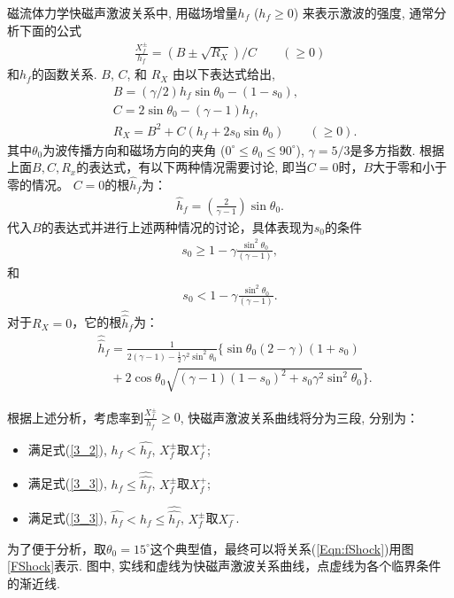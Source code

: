 \documentclass[landscape]{article}
\begin{document}
	磁流体力学快磁声激波关系中\citep{Jeffrey1964}, 用磁场增量$h_f$ ($h_f \ge 0$)
	来表示激波的强度, 通常分析下面的公式
	\begin{align}
		\frac{X_f^\pm}{h_f} = (B \pm \sqrt{R_X})/C \qquad (\ge 0) \label{Eqn:fShock}
	\end{align}
	和$h_f$的函数关系. $B$, $C$, 和 $R_X$ 由以下表达式给出,
	\begin{align}
		& B = (\gamma/2) h_f \sin\theta_0 - (1-s_0),
		\\
		& C = 2 \sin\theta_0 - (\gamma-1) h_f,
		\\
		& R_X = B^2 + C(h_f + 2 s_0 \sin\theta_0) \qquad (\ge 0).
	\end{align}
	其中$\theta_0$为波传播方向和磁场方向的夹角 ($0^\circ \le \theta_0 \le 90^\circ$),
	$\gamma=5/3$是多方指数. 根据上面$B, C, R_x$的表达式，有以下两种情况需要讨论, 即当$C=0$时，$B$大于零和小于零的情况。
	$C=0$的根$\hat{h}_f$为：
	\begin{align}\label{3_1}
		\hat{h}_f = \left(\frac{2}{\gamma-1}\right) \sin\theta_0.
	\end{align}
	代入$B$的表达式并进行上述两种情况的讨论，具体表现为$s_0$的条件
	\begin{align}\label{3_2}
		s_0 \ge 1 - \gamma \frac{\sin^2\theta_0}{(\gamma-1)},
	\end{align}
	和
	\begin{align}\label{3_3}
		s_0 < 1 - \gamma \frac{\sin^2\theta_0}{(\gamma-1)}.
	\end{align}
	对于$R_X = 0$，它的根$\hat{\hat{h}}_f$为：
	\begin{align}\label{3_4}
		& \hat{\hat{h}}_f = \frac{1}{2(\gamma-1) - \frac{1}{2} \gamma^2 \sin^2
			\theta_0}\Big\{\sin\theta_0
		(2-\gamma)(1+s_0) \nonumber
		\\
		& \quad + 2\cos\theta_0 \sqrt{(\gamma-1)(1-s_0)^2 + s_0 \gamma^2 \sin^2\theta_0}\Big\}.
	\end{align}
	
	根据上述分析，考虑率到$\frac{X^{\pm}_f}{h_f}\ge 0$, 快磁声激波关系曲线将分为三段, 分别为：
	\begin{itemize}
		\item 满足式(\ref{3_2}), $h_f<\hat{h_f}$, $X^{\pm}_f$取$X^+_f$;
		\item 满足式(\ref{3_3}), $h_f\le \hat{\hat{h_f}}$, $X^{\pm}_f$取$X^+_f$;
		\item 满足式(\ref{3_3}), $\hat{h_f}<h_f\le \hat{\hat{h_f}}$, $X^{\pm}_f$取$X^-_f$.
	\end{itemize}

	为了便于分析，取$\theta_0=15^\circ$这个典型值，最终可以将关系(\ref{Eqn:fShock})用图
	\ref{FShock}表示. 图中, 实线和虚线为快磁声激波关系曲线，点虚线为各个临界条件的渐近线.
	
\end{document}
